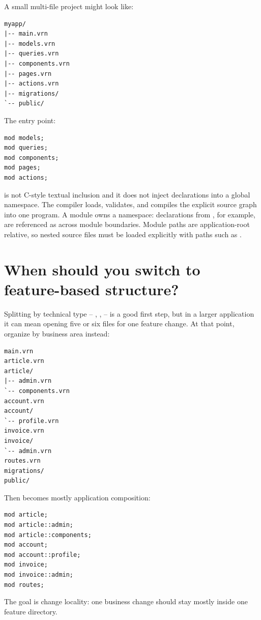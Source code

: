 A small multi-file project might look like:

\begin{lstlisting}
myapp/
|-- main.vrn
|-- models.vrn
|-- queries.vrn
|-- components.vrn
|-- pages.vrn
|-- actions.vrn
|-- migrations/
`-- public/
\end{lstlisting}

The entry point:

\begin{lstlisting}[language=Velran]
mod models;
mod queries;
mod components;
mod pages;
mod actions;
\end{lstlisting}

 is not C-style textual inclusion and it does not inject declarations into a global namespace. The compiler loads, validates, and compiles the explicit source graph into one program. A module owns a namespace: declarations from , for example, are referenced as  across module boundaries. Module paths are application-root relative, so nested source files must be loaded explicitly with paths such as .

\section{When should you switch to feature-based structure?}

Splitting by technical type -- , ,  -- is a good first step, but in a larger application it can mean opening five or six files for one feature change. At that point, organize by business area instead:

\begin{lstlisting}
main.vrn
article.vrn
article/
|-- admin.vrn
`-- components.vrn
account.vrn
account/
`-- profile.vrn
invoice.vrn
invoice/
`-- admin.vrn
routes.vrn
migrations/
public/
\end{lstlisting}

Then  becomes mostly application composition:

\begin{lstlisting}[language=Velran]
mod article;
mod article::admin;
mod article::components;
mod account;
mod account::profile;
mod invoice;
mod invoice::admin;
mod routes;
\end{lstlisting}

The goal is change locality: one business change should stay mostly inside one feature directory.

